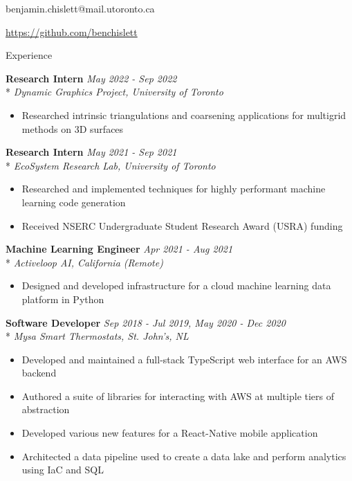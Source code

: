\documentclass[11pt, letterpaper]{article}
\title{}
\author{Benjamin Chislett}
\date{}
\begin{document}
\begin{center}
  \Huge\theauthor
  \par
  \large{benjamin.chislett@mail.utoronto.ca}
  \par
  \large\url{https://github.com/benchislett}
\end{center}

\begin{section}{Experience}

\textbf{Research Intern}
\hfill
\textit{May 2022 - Sep 2022}\\*
\textit{Dynamic Graphics Project, University of Toronto}
\begin{itemize}
  \item Researched intrinsic triangulations and coarsening applications for multigrid methods on 3D surfaces \\
\end{itemize}

\textbf{Research Intern}
\hfill
\textit{May 2021 - Sep 2021}\\*
\textit{EcoSystem Research Lab, University of Toronto}
\begin{itemize}
  \item Researched and implemented techniques for highly performant machine learning code generation
  \item Received NSERC Undergraduate Student Research Award (USRA) funding \\
\end{itemize}

\textbf{Machine Learning Engineer}
\hfill
\textit{Apr 2021 - Aug 2021}\\*
\textit{Activeloop AI, California (Remote)}
\begin{itemize}
  \item Designed and developed infrastructure for a cloud machine learning data platform in Python \\
\end{itemize}

\textbf{Software Developer}
\hfill
\textit{Sep 2018 - Jul 2019, May 2020 - Dec 2020}\\*
\textit{Mysa Smart Thermostats, St. John's, NL}
\begin{itemize}
  \item Developed and maintained a full-stack TypeScript web interface for an AWS backend
  \item Authored a suite of libraries for interacting with AWS at multiple tiers of abstraction
  \item Developed various new features for a React-Native mobile application
  \item Architected a data pipeline used to create a data lake and perform analytics using IaC and SQL \\
\end{itemize}


\end{section}
\end{document}
